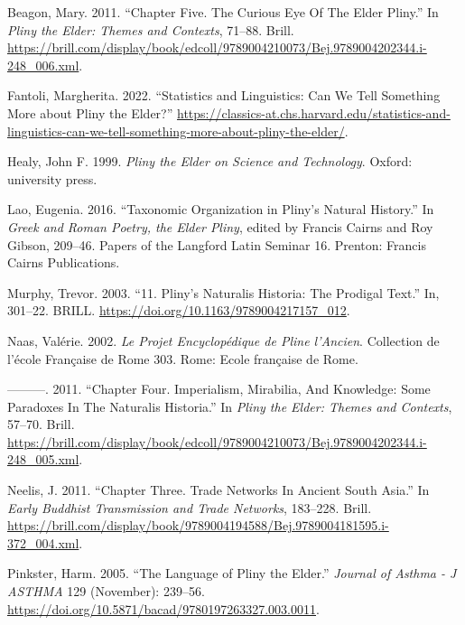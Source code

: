 \documentclass[
  12pt,
]{article}
\newlength{\cslhangindent}
\newlength{\cslentryspacingunit} %
\newenvironment{CSLReferences}[2] %
 {%
  \setlength{\parindent}{0pt}
  \ifodd #1
  \let\oldpar\par
  \def\par{\hangindent=\cslhangindent\oldpar}
  \fi
  \setlength{\parskip}{#2\cslentryspacingunit}
 }%
 {}
\begin{document}
\hypertarget{refs}{}
\begin{CSLReferences}{1}{0}
\leavevmode{}%
Beagon, Mary. 2011. {``Chapter {Five}. {The} {Curious} {Eye} {Of} {The}
{Elder} {Pliny}.''} In \emph{Pliny the {Elder}: {Themes} and
{Contexts}}, 71--88. Brill.
\url{https://brill.com/display/book/edcoll/9789004210073/Bej.9789004202344.i-248_006.xml}.

\leavevmode{}%
Fantoli, Margherita. 2022. {``Statistics and Linguistics: Can We Tell
Something More about {Pliny} the {Elder}?''}
\url{https://classics-at.chs.harvard.edu/statistics-and-linguistics-can-we-tell-something-more-about-pliny-the-elder/}.

\leavevmode{}%
Healy, John F. 1999. \emph{Pliny the {Elder} on Science and Technology}.
Oxford: university press.

\leavevmode{}%
Lao, Eugenia. 2016. {``Taxonomic {Organization} in {Pliny}'s {Natural}
{History}.''} In \emph{Greek and {Roman} Poetry, the {Elder} {Pliny}},
edited by Francis Cairns and Roy Gibson, 209--46. Papers of the
{Langford} {Latin} {Seminar} 16. Prenton: Francis Cairns Publications.

\leavevmode{}%
Murphy, Trevor. 2003. {``11. Pliny{'}s Naturalis Historia: The Prodigal
Text.''} In, 301--22. BRILL.
\url{https://doi.org/10.1163/9789004217157_012}.

\leavevmode{}%
Naas, Valérie. 2002. \emph{Le Projet Encyclopédique de {Pline}
l'{Ancien}}. Collection de l'école Française de {Rome} 303. Rome: Ecole
française de Rome.

\leavevmode{}%
---------. 2011. {``Chapter {Four}. {Imperialism}, {Mirabilia}, {And}
{Knowledge}: {Some} {Paradoxes} {In} {The} {Naturalis} {Historia}.''} In
\emph{Pliny the {Elder}: {Themes} and {Contexts}}, 57--70. Brill.
\url{https://brill.com/display/book/edcoll/9789004210073/Bej.9789004202344.i-248_005.xml}.

\leavevmode{}%
Neelis, J. 2011. {``Chapter {Three}. {Trade} {Networks} {In} {Ancient}
{South} {Asia}.''} In \emph{Early {Buddhist} {Transmission} and {Trade}
{Networks}}, 183--228. Brill.
\url{https://brill.com/display/book/9789004194588/Bej.9789004181595.i-372_004.xml}.

\leavevmode{}%
Pinkster, Harm. 2005. {``The {Language} of {Pliny} the {Elder}.''}
\emph{Journal of Asthma - J ASTHMA} 129 (November): 239--56.
\url{https://doi.org/10.5871/bacad/9780197263327.003.0011}.


\end{CSLReferences}
\end{document}
